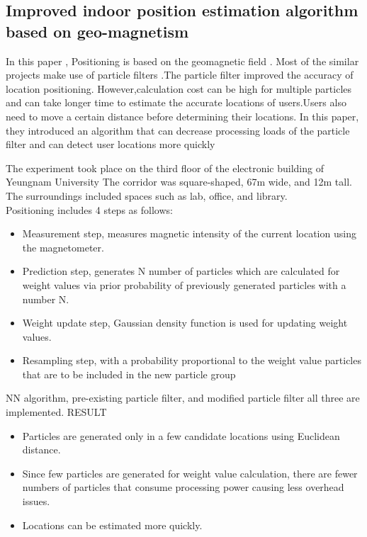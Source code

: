 ﻿\documentclass[a4paper, 12pt]{article}
\begin{document}
\subsection{Improved indoor position estimation algorithm based on geo-magnetism }
\hspace{1cm} 
In this paper , Positioning is based on the geomagnetic field . Most of the similar projects make use of particle filters .The particle filter improved the accuracy of location positioning. However,calculation cost can be high for multiple particles and can take longer time to estimate the accurate locations of users.Users also need to move a certain distance before determining their locations.  In this paper, they introduced an algorithm that can decrease processing loads of the particle filter and can detect user locations more quickly\\
\par The experiment took place on the third floor of the electronic building of Yeungnam University The corridor was square-shaped, 67m wide, and 12m tall. The surroundings included spaces such as lab, office, and library.
\\
Positioning includes 4 steps as follows:
\begin{itemize}
	\item Measurement step, measures magnetic intensity of the current location using the magnetometer. 
	\item	Prediction step,  generates N number of particles which are calculated for weight values via prior probability of previously generated particles with a number N.
	\item	Weight update step, Gaussian density function is used for updating weight values.
	\item	Resampling step, with a probability proportional to the weight value  particles that are to be included in the new particle group 		
\end{itemize}
NN algorithm, pre-existing particle filter, and modified particle filter all three are implemented.
\linebreak
\linebreak
RESULT
\begin{itemize}
	\item Particles are generated only in a few candidate locations using Euclidean distance. 
	\item	Since few particles are generated for weight value calculation, there are fewer numbers of particles that consume processing power causing less overhead issues. 
	\item Locations can be estimated more quickly. 	
\end{itemize}
\end{document}
